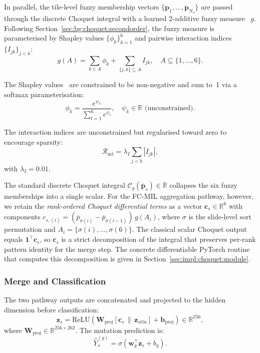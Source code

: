 In parallel, the tile-level fuzzy membership vectors
$\{\mathbf{p}_1, \ldots, \mathbf{p}_{N_s}\}$ are passed through the
discrete Choquet integral with a learned 2-additive fuzzy measure~\cite{grabisch1997kapprox} $g$.
Following Section~\ref{sec:bg:choquet:secondorder}, the fuzzy measure is
parameterised by Shapley values $\{\phi_k\}_{k=1}^{6}$ and pairwise
interaction indices $\{I_{jk}\}_{j < k}$:
\begin{equation}
\label{eq:fuzzy_measure_method}
g(A) = \sum_{k \in A} \phi_k + \sum_{\{j,k\} \subseteq A} I_{jk}, \quad A \subseteq \{1, \ldots, 6\}.
\end{equation}

The Shapley values~\cite{shapley1953value} are constrained to be non-negative and sum to~1 via a
softmax parameterisation:
\begin{equation}
\label{eq:shapley_param}
\phi_k = \frac{e^{\psi_k}}{\sum_{l=1}^{6} e^{\psi_l}}, \quad \psi_k \in \mathbb{R} \text{ (unconstrained)}.
\end{equation}

The interaction indices are unconstrained but regularised toward zero to
encourage sparsity:
\begin{equation}
\label{eq:interaction_reg}
\mathcal{R}_{\text{int}} = \lambda_I \sum_{j < k} |I_{jk}|,
\end{equation}
with $\lambda_I = 0.01$.

The standard discrete Choquet integral
$\mathcal{C}_g(\bar{\mathbf{p}}_s) \in \mathbb{R}$ collapses the
six fuzzy memberships into a single scalar.
For the FC-MIL aggregation pathway, however, we retain the
\emph{rank-ordered Choquet differential terms} as a vector
$\mathbf{c}_s \in \mathbb{R}^6$ with components
$c_{s,(i)} = (\bar{p}_{\sigma(i)} - \bar{p}_{\sigma(i-1)})\,g(A_i)$,
where $\sigma$ is the slide-level sort permutation and
$A_i = \{\sigma(i), \ldots, \sigma(6)\}$.
The classical scalar Choquet output equals
$\mathbf{1}^\top \mathbf{c}_s$, so $\mathbf{c}_s$ is a strict
decomposition of the integral that preserves per-rank pattern
identity for the merge step.
The concrete differentiable PyTorch routine that computes this
decomposition is given in Section~\ref{sec:impl:choquet:module}.

\subsubsection{Merge and Classification}

The two pathway outputs are concatenated and projected to the hidden
dimension before classification:
\begin{equation}
\label{eq:choquet_merge}
\mathbf{z}_s = \text{ReLU}\!\left(\mathbf{W}_{\text{proj}}
\left[\mathbf{c}_s \,\|\, \mathbf{z}_{\text{attn}}\right] + \mathbf{b}_{\text{proj}}\right)
\in \mathbb{R}^{256},
\end{equation}
where $\mathbf{W}_{\text{proj}} \in \mathbb{R}^{256 \times 262}$.
The mutation prediction is:
\begin{equation}
\label{eq:choquet_classifier}
\hat{Y}_s^{(g)} = \sigma\left(\mathbf{w}_g^\top \mathbf{z}_s + b_g\right).
\end{equation}

